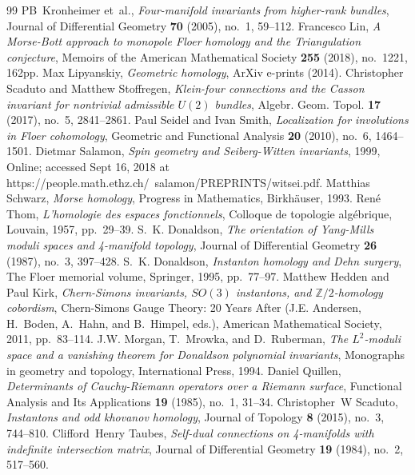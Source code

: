 \documentclass[10pt,a4paper]{amsart}
\newcommand{\etalchar}[1]{$^{#1}$}
\theoremstyle{definition}
\theoremstyle{remark}
\numberwithin{figure}{qchap}
\begin{document}
\begin{thebibliography}{99}
\bibitem[K{\etalchar{+}}05]{Kronheimer} PB~Kronheimer et~al., \emph{Four-manifold invariants from higher-rank bundles}, Journal of Differential Geometry \textbf{70} (2005), no.~1, 59--112.
 Francesco Lin, \emph{A {Morse-Bott} approach to monopole {Floer} homology and the {Triangulation} conjecture}, Memoirs of the American Mathematical Society \textbf{255} (2018), no.~1221, 162pp.
 Max {Lipyanskiy}, \emph{{Geometric homology}}, ArXiv e-prints (2014).
 Christopher Scaduto and Matthew Stoffregen, \emph{Klein-four connections and the {Casson} invariant for nontrivial admissible {$U(2)$} bundles}, Algebr. Geom. Topol. \textbf{17} (2017), no.~5, 2841--2861.
 Paul Seidel and Ivan Smith, \emph{Localization for involutions in {Floer} cohomology}, Geometric and Functional Analysis \textbf{20} (2010), no.~6, 1464--1501.
 Dietmar Salamon, \emph{Spin geometry and {Seiberg-Witten} invariants}, 1999, Online; accessed Sept 16, 2018 at https://people.math.ethz.ch/~salamon/PREPRINTS/witsei.pdf.
 Matthias Schwarz, \emph{Morse homology}, Progress in Mathematics, Birkh{\"a}user, 1993.
 Ren{\'e} Thom, \emph{L'homologie des espaces fonctionnels}, Colloque de topologie alg{\'e}brique, Louvain, 1957, pp.~29--39.
 S.~K. Donaldson, \emph{The orientation of {Yang-Mills} moduli spaces and 4-manifold topology}, Journal of Differential Geometry \textbf{26} (1987), no.~3, 397--428.
 S.~K. Donaldson, \emph{Instanton homology and {Dehn} surgery}, The Floer memorial volume, Springer, 1995, pp.~77--97.
 Matthew Hedden and Paul Kirk, \emph{{Chern-Simons} invariants, {$SO(3)$} instantons, and {$\mathbb Z/2$}-homology cobordism}, {Chern-Simons} Gauge Theory: 20 Years After (J.E. Andersen, H.~Boden, A.~Hahn, and B.~Himpel, eds.), American Mathematical Society, 2011, pp.~83--114.
 J.W. Morgan, T.~Mrowka, and D.~Ruberman, \emph{The {$L^2$}-moduli space and a vanishing theorem for {Donaldson} polynomial invariants}, Monographs in geometry and topology, International Press, 1994.
 Daniel Quillen, \emph{Determinants of {Cauchy-Riemann} operators over a {Riemann} surface}, Functional Analysis and Its Applications \textbf{19} (1985), no.~1, 31--34.
 Christopher~W Scaduto, \emph{Instantons and odd khovanov homology}, Journal of Topology \textbf{8} (2015), no.~3, 744--810.
 Clifford~Henry Taubes, \emph{Self-dual connections on 4-manifolds with indefinite intersection matrix}, Journal of Differential Geometry \textbf{19} (1984), no.~2, 517--560.
\end{thebibliography}
\end{document}
